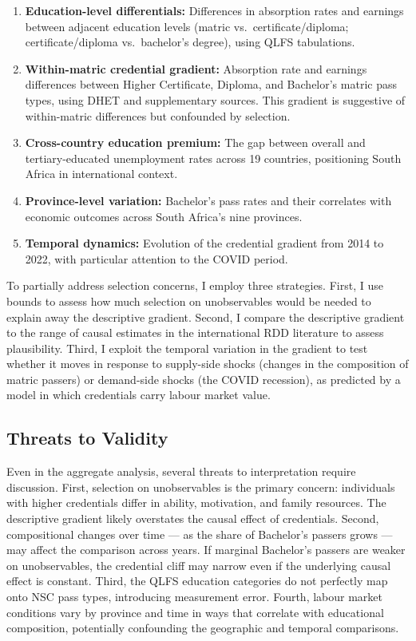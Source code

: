 \documentclass[12pt]{article}
\begin{document}
\begin{enumerate}
    \item \textbf{Education-level differentials:} Differences in absorption rates and earnings between adjacent education levels (matric vs.\ certificate/diploma; certificate/diploma vs.\ bachelor's degree), using QLFS tabulations.

    \item \textbf{Within-matric credential gradient:} Absorption rate and earnings differences between Higher Certificate, Diploma, and Bachelor's matric pass types, using DHET and supplementary sources. This gradient is suggestive of within-matric differences but confounded by selection.

    \item \textbf{Cross-country education premium:} The gap between overall and tertiary-educated unemployment rates across 19 countries, positioning South Africa in international context.

    \item \textbf{Province-level variation:} Bachelor's pass rates and their correlates with economic outcomes across South Africa's nine provinces.

    \item \textbf{Temporal dynamics:} Evolution of the credential gradient from 2014 to 2022, with particular attention to the COVID period.
\end{enumerate}

To partially address selection concerns, I employ three strategies. First, I use \citet{oster2019unobservable} bounds to assess how much selection on unobservables would be needed to explain away the descriptive gradient. Second, I compare the descriptive gradient to the range of causal estimates in the international RDD literature to assess plausibility. Third, I exploit the temporal variation in the gradient to test whether it moves in response to supply-side shocks (changes in the composition of matric passers) or demand-side shocks (the COVID recession), as predicted by a model in which credentials carry labour market value.

\subsection{Threats to Validity}

Even in the aggregate analysis, several threats to interpretation require discussion. First, selection on unobservables is the primary concern: individuals with higher credentials differ in ability, motivation, and family resources. The descriptive gradient likely overstates the causal effect of credentials. Second, compositional changes over time --- as the share of Bachelor's passers grows --- may affect the comparison across years. If marginal Bachelor's passers are weaker on unobservables, the credential cliff may narrow even if the underlying causal effect is constant. Third, the QLFS education categories do not perfectly map onto NSC pass types, introducing measurement error. Fourth, labour market conditions vary by province and time in ways that correlate with educational composition, potentially confounding the geographic and temporal comparisons.
\end{document}
